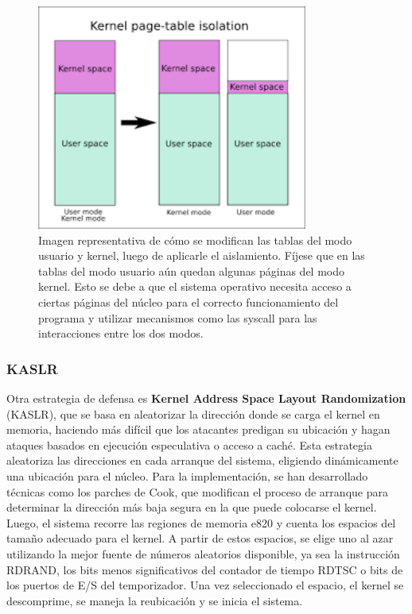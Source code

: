 \documentclass[lettersize,compsoc]{IEEEtran}
\begin{document}
\begin{figure}[h] \centering \includegraphics[width=3.5in]{isolation-page.png} \caption{\small Imagen representativa de cómo se modifican las tablas del modo usuario y kernel, luego de aplicarle el aislamiento. \newline Fíjese que en las tablas del modo usuario aún quedan algunas páginas del modo kernel. Esto se debe a que el sistema operativo necesita acceso a ciertas páginas del núcleo para el correcto funcionamiento del programa y utilizar mecanismos como las syscall para las interacciones entre los dos modos.} \end{figure}

\subsubsection{\textbf{KASLR}} Otra estrategia de defensa es \textbf{Kernel Address Space Layout Randomization}\cite{KASLR} (KASLR), que se basa en aleatorizar la dirección donde se carga el kernel en memoria, haciendo más difícil que los atacantes predigan su ubicación y hagan ataques basados en ejecución especulativa o acceso a caché. Esta estrategia aleatoriza las direcciones en cada arranque del sistema, eligiendo dinámicamente una ubicación para el núcleo. Para la implementación, se han desarrollado técnicas como los parches de Cook, que modifican el proceso de arranque para determinar la dirección más baja segura en la que puede colocarse el kernel. Luego, el sistema recorre las regiones de memoria e820 y cuenta los espacios del tamaño adecuado para el kernel. A partir de estos espacios, se elige uno al azar utilizando la mejor fuente de números aleatorios disponible, ya sea la instrucción RDRAND, los bits menos significativos del contador de tiempo RDTSC o bits de los puertos de E/S del temporizador. Una vez seleccionado el espacio, el kernel se descomprime, se maneja la reubicación y se inicia el sistema.
\end{document}
